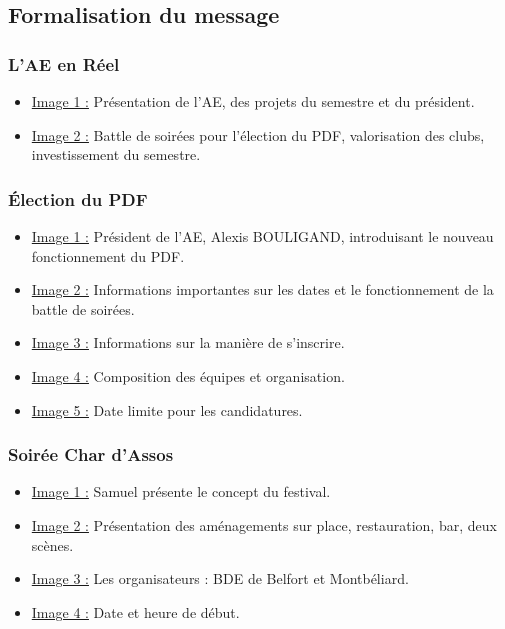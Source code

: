 
\subsection{Formalisation du message}\label{subsec:formalisation-du-message}

\subsubsection{L'AE en Réel}
\begin{itemize}
    \item \underline{Image 1 :} Présentation de l'\gls{AE}, des projets du semestre et du président.
    \item \underline{Image 2 :} Battle de soirées pour l'élection du PDF, valorisation des clubs, investissement du semestre.
\end{itemize}

\subsubsection{Élection du PDF}
\begin{itemize}
    \item \underline{Image 1 :} Président de l'AE, Alexis BOULIGAND, introduisant le nouveau fonctionnement du \gls{PDF}.
    \item \underline{Image 2 :} Informations importantes sur les dates et le fonctionnement de la battle de soirées.
    \item \underline{Image 3 :} Informations sur la manière de s'inscrire.
    \item \underline{Image 4 :} Composition des équipes et organisation.
    \item \underline{Image 5 :} Date limite pour les candidatures.
\end{itemize}

\subsubsection{Soirée Char d’Assos}
\begin{itemize}
    \item \underline{Image 1 :} Samuel présente le concept du festival.
    \item \underline{Image 2 :} Présentation des aménagements sur place, restauration, bar, deux scènes.
    \item \underline{Image 3 :} Les organisateurs : BDE de Belfort et Montbéliard.
    \item \underline{Image 4 :} Date et heure de début.
\end{itemize}

